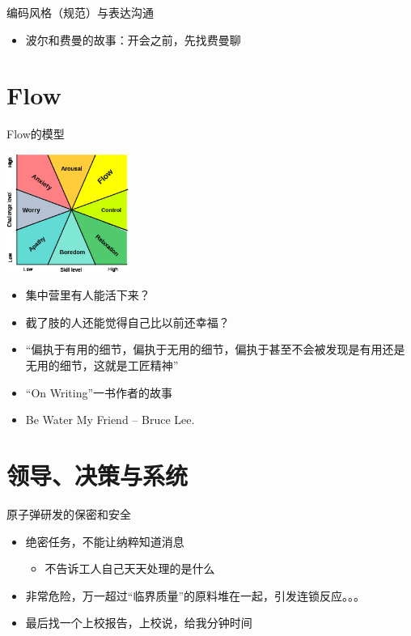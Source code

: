 \documentclass[presentation,dvipdfmx,CJKbookmarks]{beamer}
\begin{document}
\begin{CJK*}{UTF8}{simsun}
\begin{frame}[fragile,label={sec:orgcfe7bb1}]{编码风格（规范）与表达沟通}
\begin{itemize}[<+->]
\begin{itemize}
\item 波尔和费曼的故事：开会之前，先找费曼聊
\end{itemize}
\end{itemize}
\end{frame}

\section{Flow}
\label{sec:org268ed36}

\begin{frame}[label={sec:org07770fa}]{}
\begin{block}{Flow\thinspace 的模型}
\begin{center}
\includegraphics[width=4cm]{./images/flow.ps}
\end{center}
\pause
\begin{itemize}[<+->]
\item 集中营里有人能活下来？
\item 截了肢的人还能觉得自己比以前还幸福？
\item “偏执于有用的细节，偏执于无用的细节，偏执于甚至不会被发现是有用还是无用的细节，这就是工匠精神”
\item “On Writing”一书作者的故事
\item Be Water My Friend -- Bruce Lee.
\end{itemize}
\end{block}
\end{frame}

\section{领导、决策与系统}
\label{sec:org5849074}

\begin{frame}[label={sec:org1474580}]{原子弹研发的保密和安全}
\begin{itemize}
\item 绝密任务，不能让纳粹知道消息
\begin{itemize}
\item 不告诉工人自己天天处理的是什么
\end{itemize}
\item 非常危险，万一超过“临界质量”的原料堆在一起，引发连锁反应。。。
\item 最后找一个上校报告，上校说，给我\thinspace 分钟时间
\end{itemize}
\end{frame}


\end{CJK*}
\end{document}
